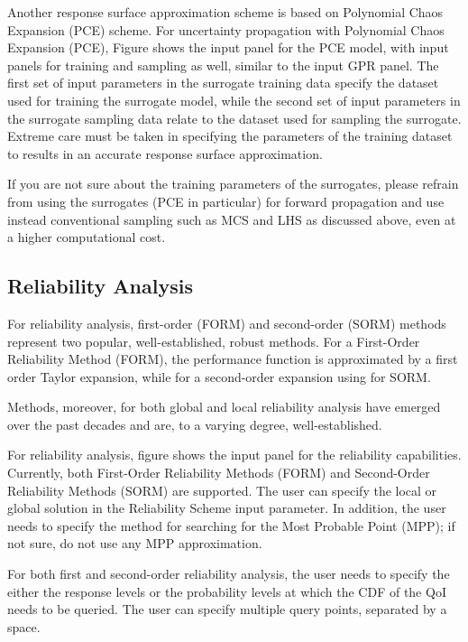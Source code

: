 Another response surface approximation scheme is based on Polynomial Chaos Expansion (PCE) scheme. For uncertainty propagation with Polynomial Chaos Expansion (PCE), Figure  shows the input panel for the PCE model, with input panels for training and sampling as well, similar to the input GPR panel. The first set of input parameters in the surrogate training data specify the dataset used for training the surrogate model, while the second set of input parameters in the surrogate sampling data relate to the dataset used for sampling the surrogate. Extreme care must be taken in specifying the parameters of the training dataset to results in an accurate response surface approximation. 

If you are not sure about the training parameters of the surrogates, please refrain from using the surrogates (PCE in particular) for forward propagation and use instead conventional sampling such as MCS and LHS as discussed above, 
even at a higher computational cost. 

\subsection{Reliability Analysis}

For reliability analysis, first-order (FORM) and second-order (SORM) methods represent two popular, well-established, robust methods. For a First-Order Reliability Method (FORM), the performance function is approximated by a first order Taylor expansion, while for a second-order expansion using for SORM. 

Methods, moreover, for both global and local reliability analysis have emerged over the past decades and are, to a varying degree, well-established. 

For reliability analysis, figure  shows the input panel for the reliability capabilities. Currently, both First-Order Reliability Methods (FORM) and Second-Order Reliability Methods (SORM) are supported. The user can specify the local or global solution in the Reliability Scheme input parameter. In addition, the user needs to specify the method for searching for the Most Probable Point (MPP); if not sure, do not use any MPP approximation. 

For both first and second-order reliability analysis, the user needs to specify the either the response levels or the probability levels at which the CDF of the QoI needs to be queried. The user can specify multiple query points, separated by a space. 


